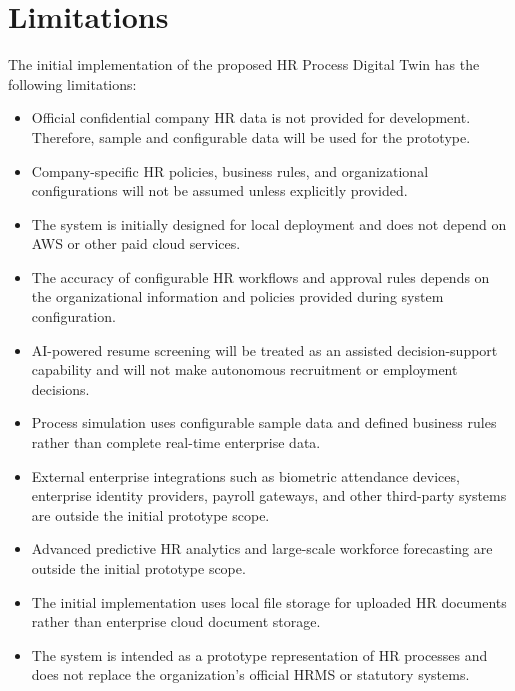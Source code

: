 \documentclass[12pt,a4paper]{article}
\begin{document}

\section{Limitations}

The initial implementation of the proposed HR Process Digital Twin
has the following limitations:

\begin{itemize}

    \item Official confidential company HR data is not provided for
    development. Therefore, sample and configurable data will be
    used for the prototype.

    \item Company-specific HR policies, business rules, and
    organizational configurations will not be assumed unless
    explicitly provided.

    \item The system is initially designed for local deployment and
    does not depend on AWS or other paid cloud services.

    \item The accuracy of configurable HR workflows and approval
    rules depends on the organizational information and policies
    provided during system configuration.

    \item AI-powered resume screening will be treated as an
    assisted decision-support capability and will not make
    autonomous recruitment or employment decisions.

    \item Process simulation uses configurable sample data and
    defined business rules rather than complete real-time enterprise
    data.

    \item External enterprise integrations such as biometric
    attendance devices, enterprise identity providers, payroll
    gateways, and other third-party systems are outside the initial
    prototype scope.

    \item Advanced predictive HR analytics and large-scale
    workforce forecasting are outside the initial prototype scope.

    \item The initial implementation uses local file storage for
    uploaded HR documents rather than enterprise cloud document
    storage.

    \item The system is intended as a prototype representation of
    HR processes and does not replace the organization's official
    HRMS or statutory systems.

\end{itemize}
\end{document}
